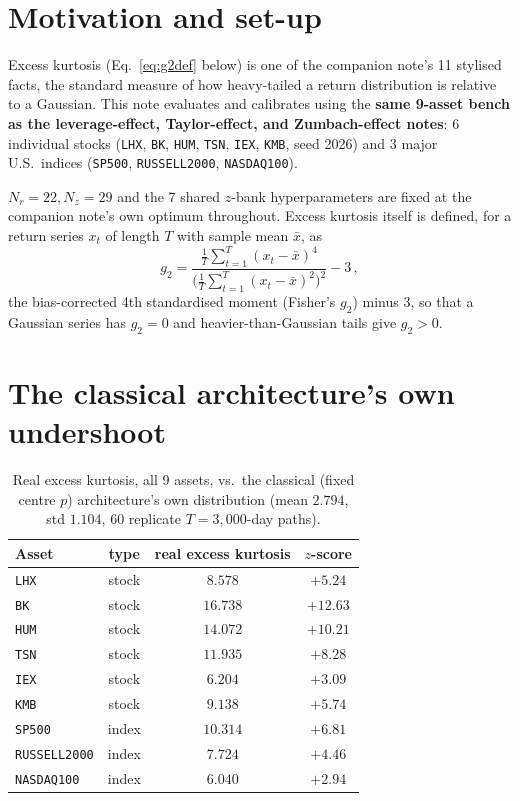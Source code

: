 \documentclass[11pt]{article}
\begin{document}
\section{Motivation and set-up}
Excess kurtosis (Eq.~\ref{eq:g2def} below) is one of the companion note's 11
stylised facts, the standard measure of how heavy-tailed a return
distribution is relative to a Gaussian. This note evaluates and calibrates
using the \textbf{same 9-asset bench as the leverage-effect, Taylor-effect,
and Zumbach-effect notes}: 6 individual stocks (\texttt{LHX}, \texttt{BK},
\texttt{HUM}, \texttt{TSN}, \texttt{IEX}, \texttt{KMB}, seed 2026) and 3
major U.S.\ indices (\texttt{SP500}, \texttt{RUSSELL2000},
\texttt{NASDAQ100}).

$N_r=22,N_z=29$ and the 7 shared $z$-bank hyperparameters are fixed at the
companion note's own optimum throughout. Excess kurtosis itself is defined,
for a return series $x_t$ of length $T$ with sample mean $\bar x$, as
\begin{equation}
g_2 = \frac{\frac{1}{T}\sum_{t=1}^{T}(x_t-\bar x)^4}
{\Big(\frac{1}{T}\sum_{t=1}^{T}(x_t-\bar x)^2\Big)^2} - 3\, ,
\label{eq:g2def}
\end{equation}
the bias-corrected 4th standardised moment (Fisher's $g_2$) minus $3$, so
that a Gaussian series has $g_2=0$ and heavier-than-Gaussian tails give
$g_2>0$.

\section{The classical architecture's own undershoot}
\label{sec:classical}
\begin{table}[h]
\centering
\caption{Real excess kurtosis, all 9 assets, vs.\ the classical (fixed
centre $p$) architecture's own distribution (mean $2.794$, std $1.104$, 60
replicate $T=3{,}000$-day paths).}
\label{tab:classical}
\begin{tabular}{lccc}
\toprule
Asset & type & real excess kurtosis & $z$-score \\
\midrule
\texttt{LHX}         & stock & $8.578$  & $+5.24$  \\
\texttt{BK}          & stock & $16.738$ & $+12.63$ \\
\texttt{HUM}         & stock & $14.072$ & $+10.21$ \\
\texttt{TSN}         & stock & $11.935$ & $+8.28$  \\
\texttt{IEX}         & stock & $6.204$  & $+3.09$  \\
\texttt{KMB}         & stock & $9.138$  & $+5.74$  \\
\texttt{SP500}       & index & $10.314$ & $+6.81$  \\
\texttt{RUSSELL2000} & index & $7.724$  & $+4.46$  \\
\texttt{NASDAQ100}   & index & $6.040$  & $+2.94$  \\
\bottomrule
\end{tabular}
\end{table}
\end{document}
